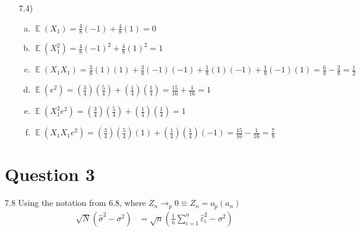 \documentclass{article}
\newcommand{\pfrac}[2]{\left(\frac{#1}{#2}\right)}
\DeclareMathOperator{\E}{\mathbb{E}}%
\begin{document}
\begin{itemize}
	\item[7.4)] 
		\begin{enumerate}[(a)]
			\item $ \E(X_1) = \frac{4}{8}(-1) + \frac{4}{8}(1) = 0 $
			\item $ \E(X_1^2) =  \frac{4}{8}(-1)^2 + \frac{4}{8}(1)^2 = 1  $
			\item $ \E(X_1X_1) = \frac{3}{8}(1)(1) + \frac{3}{8}(-1)(-1) + \frac{1}{8}(1)(-1) + \frac{1}{8}(-1)(1) = \frac{6}{8} - \frac{2}{8} = \frac{1}{2} $
			\item $ \E(e^2) = \pfrac{3}{4}\left(\frac{5}{4}\right) + \pfrac{1}{4}\left(\frac{1}{4}\right) = \frac{15}{16} + \frac{1}{16} = 1 $
			\item $ \E(X_1^2e^2) = \pfrac{3}{4}\left(\frac{5}{4}\right) + \pfrac{1}{4}\left(\frac{1}{4}\right) = 1  $
			\item $ \E(X_1X_1e^2) = \pfrac{3}{4}\pfrac{5}{4}(1) + \pfrac{1}{4}\pfrac{1}{4}(-1) = \frac{15}{16} - \frac{1}{16} = \frac{7}{8} $
		\end{enumerate}
	
\end{itemize}


\section*{Question 3}
7.8
Using the notation from 6.8, where ${Z_n\rightarrow_p0\equiv Z_n=o_p(a_n)}$
\begin{align*}
	\sqrt{N}\left(\hat{\sigma}^2-\sigma^2\right)	&=	\sqrt{n}\left(\frac{1}{n}\sum_{i=1}^n\hat{\varepsilon}_i^2-\sigma^2\right)
\end{align*}

\end{document}
